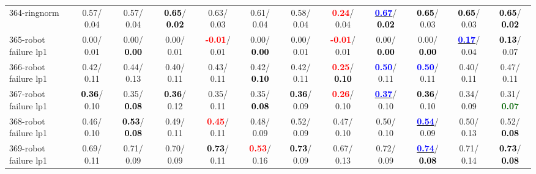 \begin{table}[h]
\begin{center}
{\begin{tabular}{lc|c|c|c|c|c|c|c|c|c|c}
364-ringnorm &   0.57/  0.04 &   0.57/  0.04 & \textcolor{black}{\textbf{  0.65}}/\textcolor{black}{\textbf{  0.02}} &   0.63/  0.03 &   0.61/  0.04 &   0.58/  0.04 & \textcolor{red}{\textbf{  0.24}}/  0.04 & \underline{\textcolor{blue}{\textbf{  0.67}}}/\textcolor{black}{\textbf{  0.02}} & \textcolor{black}{\textbf{  0.65}}/  0.03 & \textcolor{black}{\textbf{  0.65}}/  0.03 & \textcolor{black}{\textbf{  0.65}}/\textcolor{black}{\textbf{  0.02}} \\
365-robot failure lp1 &   0.00/  0.01 &   0.00/\textcolor{black}{\textbf{  0.00}} &   0.00/  0.01 & \textcolor{red}{\textbf{ -0.01}}/  0.01 &   0.00/\textcolor{black}{\textbf{  0.00}} &   0.00/  0.01 & \textcolor{red}{\textbf{ -0.01}}/  0.01 &   0.00/\textcolor{black}{\textbf{  0.00}} &   0.00/\textcolor{black}{\textbf{  0.00}} & \underline{\textcolor{blue}{\textbf{  0.17}}}/  0.04 & \textcolor{black}{\textbf{  0.13}}/  0.07 \\
366-robot failure lp1 &   0.42/  0.11 &   0.44/  0.13 &   0.40/  0.11 &   0.43/  0.11 &   0.42/\textcolor{black}{\textbf{  0.10}} &   0.42/  0.11 & \textcolor{red}{\textbf{  0.25}}/\textcolor{black}{\textbf{  0.10}} & \textcolor{blue}{\textbf{  0.50}}/  0.11 & \textcolor{blue}{\textbf{  0.50}}/  0.11 &   0.40/  0.11 &   0.47/  0.11 \\ \hline
367-robot failure lp1 & \textcolor{black}{\textbf{  0.36}}/  0.10 &   0.35/\textcolor{black}{\textbf{  0.08}} & \textcolor{black}{\textbf{  0.36}}/  0.12 &   0.35/  0.11 &   0.35/\textcolor{black}{\textbf{  0.08}} & \textcolor{black}{\textbf{  0.36}}/  0.09 & \textcolor{red}{\textbf{  0.26}}/  0.10 & \underline{\textcolor{blue}{\textbf{  0.37}}}/  0.10 & \textcolor{black}{\textbf{  0.36}}/  0.10 &   0.34/  0.09 &   0.31/\textcolor{darkgreen}{\textbf{  0.07}} \\
368-robot failure lp1 &   0.46/  0.10 & \textcolor{black}{\textbf{  0.53}}/\textcolor{black}{\textbf{  0.08}} &   0.49/  0.11 & \textcolor{red}{\textbf{  0.45}}/  0.11 &   0.48/  0.09 &   0.52/  0.09 &   0.47/  0.10 &   0.50/  0.10 & \underline{\textcolor{blue}{\textbf{  0.54}}}/  0.09 &   0.50/  0.13 &   0.52/\textcolor{black}{\textbf{  0.08}} \\
369-robot failure lp1 &   0.69/  0.11 &   0.71/  0.09 &   0.70/  0.09 & \textcolor{black}{\textbf{  0.73}}/  0.11 & \textcolor{red}{\textbf{  0.53}}/  0.16 & \textcolor{black}{\textbf{  0.73}}/  0.09 &   0.67/  0.13 &   0.72/  0.09 & \underline{\textcolor{blue}{\textbf{  0.74}}}/\textcolor{black}{\textbf{  0.08}} &   0.71/  0.14 & \textcolor{black}{\textbf{  0.73}}/\textcolor{black}{\textbf{  0.08}} \\

\end{tabular}}
\end{center}
\end{table}
